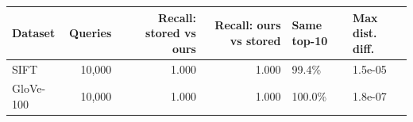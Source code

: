 \begin{tabular}{lrrrll}
\toprule
Dataset & Queries & Recall: stored vs ours & Recall: ours vs stored & Same top-10 & Max dist. diff. \\
\midrule
SIFT & 10,000 & 1.000 & 1.000 & 99.4\% & 1.5e-05 \\
GloVe-100 & 10,000 & 1.000 & 1.000 & 100.0\% & 1.8e-07 \\
\bottomrule
\end{tabular}
